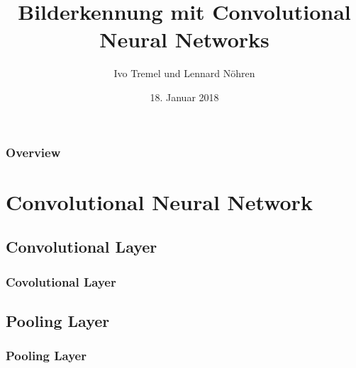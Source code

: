 \documentclass{beamer}
\title[Convolutional Neural Networks]{Bilderkennung mit Convolutional Neural Networks} %
\author{Ivo Tremel und Lennard Nöhren} %
\institute[CHI] %
{
Leibniz Universität Hannover \\ %
\medskip
}
\date{18. Januar 2018} %
\begin{document}
\begin{frame}
\titlepage %
\end{frame}

\begin{frame}
\frametitle{Overview} %
\tableofcontents %
\end{frame}


\section{Convolutional Neural Network} %

\subsection{Convolutional Layer} %

\begin{frame}
	\frametitle{Covolutional Layer}
\end{frame}


\subsection{Pooling Layer}

\begin{frame}
	\frametitle{Pooling Layer}
\end{frame}
\end{document}
